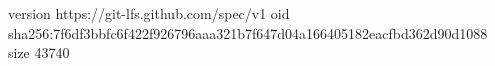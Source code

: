 version https://git-lfs.github.com/spec/v1
oid sha256:7f6df3bbfc6f422f926796aaa321b7f647d04a166405182eacfbd362d90d1088
size 43740
